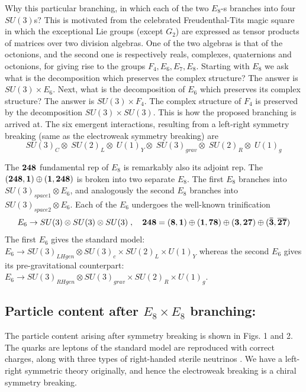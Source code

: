 \documentclass{iopconfser}
\begin{document}
Why this particular branching, in which each of the two $E_8$-s branches into four $SU(3)$s? This is motivated from the celebrated Freudenthal-Tits magic square in which the exceptional Lie groups (except $G_2$) are expressed as tensor products of matrices over two division algebras. One of the two algebras is that of the octonions, and the second one is respectively reals, complexes, quaternions and octonions, for giving rise to the groups $F_4, E_6, E_7, E_8$. Starting with $E_8$ we ask what is the decomposition which preserves the complex structure? The answer is $SU(3) \times E_6$. Next, what is the decomposition of $E_6$ which preserves its complex structure? The answer is $SU(3) \times F_4$. The complex structure of $F_4$ is preserved by the decomposition $SU(3) \times SU(3)$. This is how the proposed branching is arrived at. The six  emergent interactions, resulting from a left-right symmetry breaking (same as the electroweak symmetry breaking) are
\begin{equation}
SU(3)_C \otimes \; SU(2)_{L} \otimes \; U(1)_Y \otimes \; SU(3)_{grav} \otimes\; SU(2)_{R} \otimes\; U(1)_{g}
\end{equation}

The ${\bf 248}$ fundamental rep of $E_8$ is remarkably also its adjoint rep. The $(\bf 248, \bf 1) \oplus (\bf 1, \bf 248)$ is broken into two separate $E_8$. The first  $E_8$ branches into  $SU(3)_{space1} \otimes E_6$, and analogously the second $E_8$ branches into $SU(3)_{space2} \otimes E_6$. Each of the $E_6$ undergoes the well-known trinification
\begin{equation}
E_6\rightarrow SU(3) \otimes SU(3) \otimes SU(3)\; , \quad \bf 248 = (8,1) \oplus (1,78) \oplus (3,27) \oplus (\bar{3}, \overline{27})
\end{equation}
The first $E_6$ gives the standard model: $E_6 \rightarrow SU(3)_{LHgen} \otimes SU(3)_c \times SU(2)_L \times U(1)_{Y}$ whereas the second $E_6$ gives its pre-gravitational counterpart: $ E_6 \rightarrow SU(3)_{RHgen} \otimes SU(3)_{grav} \times SU(2)_R \times U(1)_{g}$.

\subsection{Particle content after $E_8 \times E_8$ branching:}
The particle content arising after symmetry breaking is shown in Figs. 1 and 2. The quarks are leptons of the standard model are reproduced with correct charges, along with three types of right-handed sterile neutrinos \cite{Kau}. We have a left-right symmetric theory originally, and hence the electroweak breaking is a chiral symmetry breaking.
\end{document}
